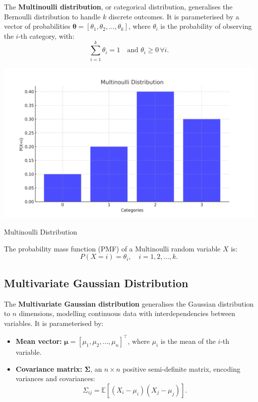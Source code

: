 The \textbf{Multinoulli distribution}, or categorical distribution, generalises the Bernoulli distribution to handle $k$ discrete outcomes. It is parameterised by a vector of probabilities $\boldsymbol{\theta} = [\theta_1, \theta_2, \ldots, \theta_k]$, where $\theta_i$ is the probability of observing the $i$-th category, with:
\[
    \sum_{i=1}^k \theta_i = 1 \quad \text{and } \theta_i \geq 0 \, \forall i.
\]
\begin{marginfigure}
    \includegraphics[width=\linewidth]{img/multinoulli_distribution.png}
    \caption{Multinoulli Distribution}
    \label{fig:multinoulli}
\end{marginfigure}

The probability mass function (PMF) of a Multinoulli random variable $X$ is:
\[
    P(X = i) = \theta_i, \quad i = 1, 2, \ldots, k.
\]


\subsection{Multivariate Gaussian Distribution}


The \textbf{Multivariate Gaussian distribution} generalises the Gaussian distribution to $n$ dimensions, modelling continuous data with interdependencies between variables. It is parameterised by:
\begin{itemize}
    \item \textbf{Mean vector:} $\boldsymbol{\mu} = [\mu_1, \mu_2, \ldots, \mu_n]^\top$, where $\mu_i$ is the mean of the $i$-th variable.
    \item \textbf{Covariance matrix:} $\boldsymbol{\Sigma}$, an $n \times n$ positive semi-definite matrix, encoding variances and covariances:
          \[
              \Sigma_{ij} = \mathbb{E}[(X_i - \mu_i)(X_j - \mu_j)].
          \]
\end{itemize}

